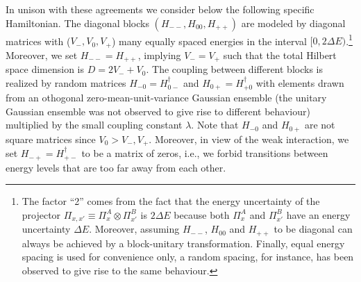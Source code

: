 \documentclass[pre,twocolumn,10pt,aps,longbibliography,nofootinbib]{revtex4-1}
\begin{document}
In unison with these agreements we consider below the following specific Hamiltonian. The diagonal blocks
$(H_{--},H_{00},H_{++})$ are modeled by diagonal matrices with ($V_-,V_0,V_+$) many equally spaced energies in the
interval $[0,2\Delta E)$.\footnote{The factor ``2'' comes from the fact that the energy uncertainty of the projector
$\Pi_{x,x'} \equiv \Pi_x^A\otimes\Pi_{x'}^B$ is $2\Delta E$ because both $\Pi_x^A$ and $\Pi_{x'}^B$ have an energy
uncertainty $\Delta E$. Moreover, assuming $H_{--}$, $H_{00}$ and $H_{++}$ to be diagonal can always be achieved by a
block-unitary transformation. Finally, equal energy spacing is used for convenience only, a random spacing, for instance,
has been observed to give rise to the same behaviour.} Moreover, we set $H_{--} = H_{++}$, implying $V_-=V_+$ such that
the total Hilbert space dimension is $D=2V_- + V_0$. The coupling between different blocks is realized by random
matrices $H_{-0} = H_{0-}^\dagger$ and $H_{0+} = H_{+0}^\dagger$ with elements drawn from an othogonal
zero-mean-unit-variance Gaussian ensemble (the unitary Gaussian ensemble was not observed to give rise to different  behaviour) multiplied by the small coupling constant $\lambda$. Note that $H_{-0}$ and $H_{0+}$ are not square
matrices since $V_0 > V_-,V_+$. Moreover, in view of the weak interaction, we set $H_{-+} = H_{+-}^\dagger$ to be a
matrix of zeros, i.e., we forbid transitions between energy levels that are too far away from each other.
\end{document}
